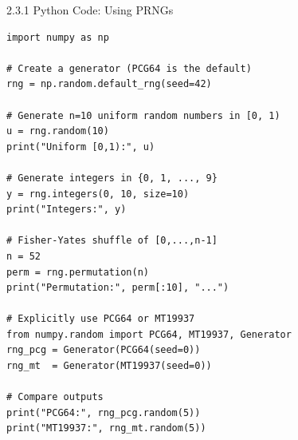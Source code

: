 \documentclass[aspectratio=169,10pt]{beamer}
\begin{document}
\begin{frame}[fragile]{2.3.1 Python Code: Using PRNGs}

\begin{lstlisting}[style=python]
import numpy as np

# Create a generator (PCG64 is the default)
rng = np.random.default_rng(seed=42)

# Generate n=10 uniform random numbers in [0, 1)
u = rng.random(10)
print("Uniform [0,1):", u)

# Generate integers in {0, 1, ..., 9}
y = rng.integers(0, 10, size=10)
print("Integers:", y)

# Fisher-Yates shuffle of [0,...,n-1]
n = 52
perm = rng.permutation(n)
print("Permutation:", perm[:10], "...")

# Explicitly use PCG64 or MT19937
from numpy.random import PCG64, MT19937, Generator
rng_pcg = Generator(PCG64(seed=0))
rng_mt  = Generator(MT19937(seed=0))

# Compare outputs
print("PCG64:", rng_pcg.random(5))
print("MT19937:", rng_mt.random(5))
\end{lstlisting}

\end{frame}
\end{document}
